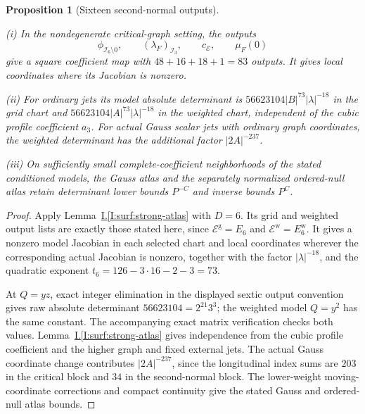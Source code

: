 \documentclass[11pt]{amsart}
\newtheorem{proposition}[theorem]{Proposition}
\theoremstyle{definition}
\theoremstyle{remark}
\numberwithin{equation}{section}
\newcommand{\partIref}[1]{\hyperref[I:#1]{I.\ref*{I:#1}}}
\begin{document}
\begin{proposition}[Sixteen second-normal outputs]\label{low:6:nc36:strong-atlas}

\noindent\textup{(i)} In the nondegenerate critical-graph setting, the outputs
\[
 \phi_{\mathcal I_6\setminus0},\qquad
 (\lambda_F)_{\mathcal I_3},\qquad
c_{\mathcal E},\qquad
 \mu_F(0)
\]
give a square coefficient map with $48+16+18+1=83$ outputs. It gives local coordinates where its Jacobian is nonzero.

\noindent\textup{(ii)} For ordinary jets its model absolute determinant is $56623104|B|^{73}|\lambda|^{-18}$ in the grid chart and $56623104|A|^{73}|\lambda|^{-18}$ in the weighted chart, independent of the cubic profile coefficient $a_3$. For actual Gauss scalar jets with ordinary graph coordinates, the weighted determinant has the additional factor $|2A|^{-237}$.

\noindent\textup{(iii)} On sufficiently small complete-coefficient neighborhoods of the stated conditioned models, the Gauss atlas and the separately normalized ordered-null atlas retain determinant lower bounds $P^{-C}$ and inverse bounds $P^C$.
\end{proposition}
\begin{proof}
Apply Lemma~\partIref{surf:strong-atlas} with $D=6$. Its grid and weighted output lists are exactly those stated here, since $\mathcal E^{\mathrm g}=E_6$ and $\mathcal E^{\mathrm w}=E_6^{\mathrm w}$. It gives a nonzero model Jacobian in each selected chart and local coordinates wherever the corresponding actual Jacobian is nonzero, together with the factor $|\lambda|^{-18}$, and the quadratic exponent $t_6=126-3\cdot16-2-3=73$.

At $Q=yz$, exact integer elimination in the displayed sextic output convention gives raw absolute determinant $56623104=2^{21}3^3$; the weighted model $Q=y^2$ has the same constant. The accompanying exact matrix verification checks both values. Lemma~\partIref{surf:strong-atlas} gives independence from the cubic profile coefficient and the higher graph and fixed external jets. The actual Gauss coordinate change contributes $|2A|^{-237}$, since the longitudinal index sums are $203$ in the critical block and $34$ in the second-normal block. The lower-weight moving-coordinate corrections and compact continuity give the stated Gauss and ordered-null atlas bounds.
\end{proof}
\end{document}
